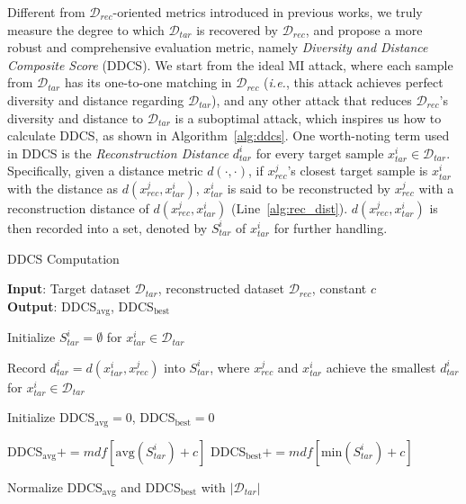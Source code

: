 Different from $\mathcal{D}_{rec}$-oriented metrics introduced in previous works, we truly measure the degree to which $\mathcal{D}_{tar}$ is recovered by $\mathcal{D}_{rec}$, and propose a more robust and comprehensive evaluation metric, namely \textit{Diversity and Distance Composite Score} (DDCS).
We start from the ideal MI attack, where each sample from $\mathcal{D}_{tar}$ has its one-to-one matching in $\mathcal{D}_{rec}$ (\emph{i.e.}, this attack achieves perfect diversity and distance regarding $\mathcal{D}_{tar}$), and any other attack that reduces $\mathcal{D}_{rec}$'s diversity and distance to $\mathcal{D}_{tar}$ is a suboptimal attack, which inspires us how to calculate DDCS, as shown in Algorithm~\ref{alg:ddcs}.
One worth-noting term used in DDCS is the \textit{Reconstruction Distance} $d^i_{tar}$ for every target sample $x^i_{tar} \in \mathcal{D}_{tar}$.
Specifically, given a distance metric $d(\cdot,\cdot)$, if $x^j_{rec}$'s closest target sample is $x^i_{tar}$ with the distance as $d(x^j_{rec}, x^i_{tar})$, $x^i_{tar}$ is said to be reconstructed by $x^j_{rec}$ with a reconstruction distance of $d(x^j_{rec}, x^i_{tar})$ (Line~\ref{alg:rec_dist}).
$d(x^j_{rec}, x^i_{tar})$ is then recorded into a set, denoted by $S_{tar}^{i}$ of $x^i_{tar}$ for further handling.

\begin{algorithm}[htb]
	\caption{DDCS Computation}
	\label{alg:ddcs}
    \textbf{Input}: Target dataset $\mathcal{D}_{tar}$, reconstructed dataset    $\mathcal{D}_{rec}$, constant $c$ \\
    \textbf{Output}: DDCS$_{\text{avg}}$, DDCS$_{\text{best}}$ %
	\begin{algorithmic}[1]
	\STATE Initialize $S_{tar}^i=\emptyset$ for $x^i_{tar} \in \mathcal{D}_{tar}$
	
    \STATE Record $d_{tar}^i=d(x^i_{tar},x^j_{rec})$ into $S_{tar}^i$, where $x^{j}_{rec}$ and $x^{i}_{tar}$ achieve the smallest $d_{tar}^i$ for $x^{i}_{tar} \in \mathcal{D}_{tar}$ \label{alg:rec_dist}
	\ENDFOR
	
	\STATE Initialize DDCS$_{\text{avg}}=0$, DDCS$_{\text{best}}=0$
	
    \STATE DDCS$_{\text{avg}} += mdf[\text{avg}(S_{tar}^i)+c]$ \label{alg:ddcs:avg}
	\STATE DDCS$_{\text{best}} += mdf[\text{min}(S_{tar}^i)+c]$ \label{alg:ddcs:best}
    \ENDFOR
	
	\STATE Normalize DDCS$_{\text{avg}}$ and DDCS$_{\text{best}}$ with $|\mathcal{D}_{tar}|$ 
 \end{algorithmic}
 \label{alg:ddcs:normalize}
\end{algorithm}

